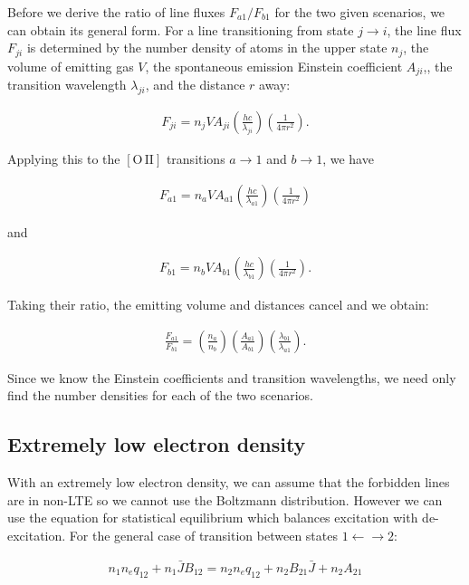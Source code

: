 \documentclass[12pt]{article}
\begin{document}
Before we derive the ratio of line fluxes $F_{a1}/F_{b1}$ for the two given scenarios, we can obtain its general form. For a line transitioning from state $j \rightarrow i$, the line flux $F_{ji}$ is determined by the number density of atoms in the upper state $n_j$, the volume of emitting gas $V$, the spontaneous emission Einstein coefficient $A_{ji}$,, the transition wavelength $\lambda_{ji}$, and the distance $r$ away:

\begin{align*}
F_{ji} = n_jVA_{ji}\left(\frac{hc}{\lambda_{ji}}\right) \left(\frac{1}{4\pi r^2}\right).
\end{align*}

Applying this to the $\mathrm{[O\,II]}$ transitions $a\rightarrow1$ and $b\rightarrow1$, we have

\begin{align*}
F_{a1} = n_aVA_{a1}\left(\frac{hc}{\lambda_{a1}}\right) \left(\frac{1}{4\pi r^2}\right)
\end{align*}

and

\begin{align*}
F_{b1} = n_bVA_{b1}\left(\frac{hc}{\lambda_{b1}}\right) \left(\frac{1}{4\pi r^2}\right).
\end{align*}

Taking their ratio, the emitting volume and distances cancel and we obtain:

\begin{align*}
\frac{F_{a1}}{F_{b1}} = \left(\frac{n_a}{n_b}\right) \left(\frac{A_{a1}}{A_{b1}}\right) \left(\frac{\lambda_{b1}}{\lambda_{a1}}\right).
\end{align*}

Since we know the Einstein coefficients and transition wavelengths, we need only find the number densities for each of the two scenarios.

\subsection*{Extremely low electron density}

With an extremely low electron density, we can assume that the forbidden lines are in non-LTE so we cannot use the Boltzmann distribution. However we can use the equation for statistical equilibrium which balances excitation with de-excitation. For the general case of transition between states $1 \leftarrow\rightarrow 2$:

\begin{align*}
n_1n_eq_{12} + n_1\bar{J}B_{12} = n_2n_eq_{12} + n_2B_{21}\bar{J} + n_2A_{21}
\end{align*}
\end{document}
